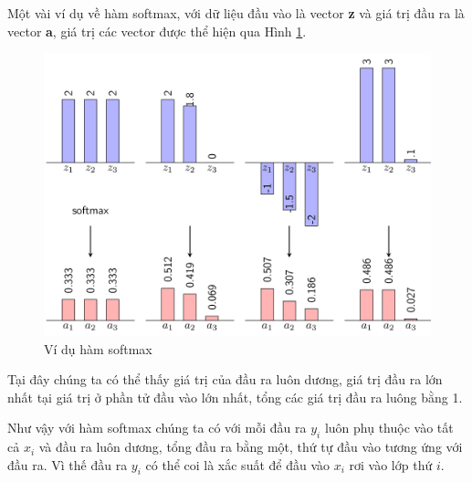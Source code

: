 Một vài ví dụ về hàm softmax, với dữ liệu đầu vào là vector \textbf{z} và giá trị đầu ra là vector \textbf{a}, giá trị các vector được thể hiện qua Hình \ref{fig:vdsoftmax}.
\begin{center}
	\begin{figure}[htp]
	\begin{center}
		\includegraphics[scale=0.1]{chap3/image/softmax_ex.png}
	\end{center}			
	\caption{Ví dụ hàm softmax}
	\label{fig:vdsoftmax}
	\end{figure}
\end{center}
Tại đây chúng ta có thể thấy giá trị của đầu ra luôn dương, giá trị đầu ra lớn nhất tại giá trị ở phần tử đầu vào lớn nhất, tổng các giá trị đầu ra luông bằng 1. \par

Như vậy với hàm softmax chúng ta có với mỗi đầu ra \textit{$y_i$} luôn phụ thuộc vào tất cả \textit{$x_i$} và đầu ra luôn dương, tổng đầu ra bằng một, thứ tự đầu vào tương ứng với đầu ra. Vì thế  đầu ra $y_i$ có thể coi là xắc suất để đầu vào $x_i$ rơi vào lớp thứ $i$.



